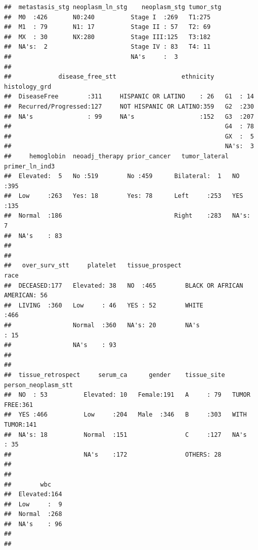\documentclass[]{article}
\begin{document}
\begin{verbatim}
##  metastasis_stg neoplasm_ln_stg    neoplasm_stg tumor_stg
##  M0  :426       N0:240          Stage I  :269   T1:275   
##  M1  : 79       N1: 17          Stage II : 57   T2: 69   
##  MX  : 30       NX:280          Stage III:125   T3:182   
##  NA's:  2                       Stage IV : 83   T4: 11   
##                                 NA's     :  3            
##                                                          
##             disease_free_stt                  ethnicity   histology_grd
##  DiseaseFree        :311     HISPANIC OR LATINO    : 26   G1  : 14     
##  Recurred/Progressed:127     NOT HISPANIC OR LATINO:359   G2  :230     
##  NA's               : 99     NA's                  :152   G3  :207     
##                                                           G4  : 78     
##                                                           GX  :  5     
##                                                           NA's:  3     
##     hemoglobin  neoadj_therapy prior_cancer   tumor_lateral primer_ln_ind3
##  Elevated:  5   No :519        No :459      Bilateral:  1   NO  :395      
##  Low     :263   Yes: 18        Yes: 78      Left     :253   YES :135      
##  Normal  :186                               Right    :283   NA's:  7      
##  NA's    : 83                                                             
##                                                                           
##                                                                           
##   over_surv_stt     platelet   tissue_prospect                        race    
##  DECEASED:177   Elevated: 38   NO  :465        BLACK OR AFRICAN AMERICAN: 56  
##  LIVING  :360   Low     : 46   YES : 52        WHITE                    :466  
##                 Normal  :360   NA's: 20        NA's                     : 15  
##                 NA's    : 93                                                  
##                                                                               
##                                                                               
##  tissue_retrospect     serum_ca      gender    tissue_site  person_neoplasm_stt
##  NO  : 53          Elevated: 10   Female:191   A     : 79   TUMOR FREE:361     
##  YES :466          Low     :204   Male  :346   B     :303   WITH TUMOR:141     
##  NA's: 18          Normal  :151                C     :127   NA's      : 35     
##                    NA's    :172                OTHERS: 28                      
##                                                                                
##                                                                                
##        wbc     
##  Elevated:164  
##  Low     :  9  
##  Normal  :268  
##  NA's    : 96  
##                
## 
\end{verbatim}
\end{document}
